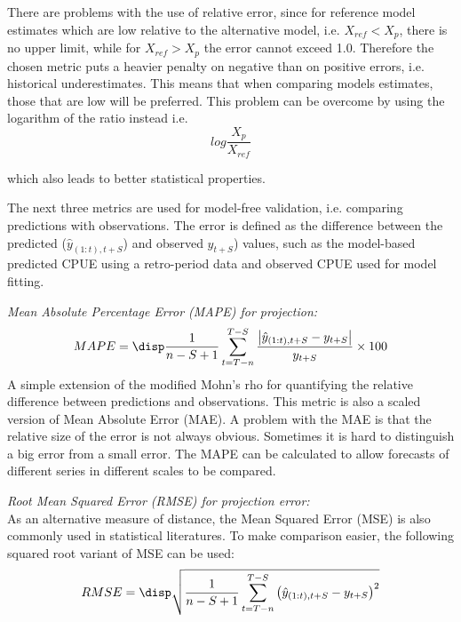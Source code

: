 There are problems with the use of relative error, since for reference model estimates which are low relative to the alternative model, i.e. $X_{ref} < X_{p}$, there is no upper limit, while for $X_{ref} > X_{p}$ the error cannot exceed 1.0. Therefore the chosen metric puts a heavier penalty on negative than on positive errors, i.e. historical underestimates. This means that when comparing models estimates, those that are low will be preferred. This problem can be overcome by using the logarithm of the ratio instead i.e. 
\begin{equation}
\label{eqn:re}
log\frac{X_{p}}{X_{ref}}
\end{equation}

which also leads to better statistical properties.


\vspace{0.2cm} 
The next three metrics are used for model-free validation, i.e. comparing predictions with observations. The error is defined as the difference between the predicted ($\hat{y}_{(1:t),t+S}$) and observed $y_{t+S}$) values, such as the model-based predicted CPUE using a retro-period data and observed CPUE used for model fitting. 

\vspace{0.2cm} \noindent
{\it Mean Absolute Percentage Error (MAPE) for projection:}
\begin{equation}
\label{eqn:mape}
MAPE = \disp \frac{1}{n-S+1} \sum_{t=T-n}^{T-S}
\frac{\left| \hat{y}_{(1:t),t+S}-y_{t+S} \right|}{y_{t+S}} \times 100 
\end{equation} 
A simple extension of the modified Mohn's rho for quantifying the relative difference between predictions and observations. This metric is also a scaled version of Mean Absolute Error (MAE). A problem with the MAE is that the relative size of the error is not always obvious. Sometimes it is hard to distinguish a big error from a small error. The MAPE can be calculated to allow forecasts of different series in different scales to be compared.

\vspace{0.2cm} \noindent
{\it Root Mean Squared Error (RMSE) for projection error:}\\
As an alternative measure of distance, the Mean Squared Error (MSE) is also commonly used in statistical literatures. To make comparison easier, the following squared root variant of MSE can be used: 
\begin{equation}
\label{eqn:rmse}
RMSE = \disp \sqrt{ \frac{1}{n-S+1} \sum_{t=T-n}^{T-S} 
\left( \hat{y}_{(1:t),t+S}-y_{t+S} \right)^2 }
\end{equation} 

